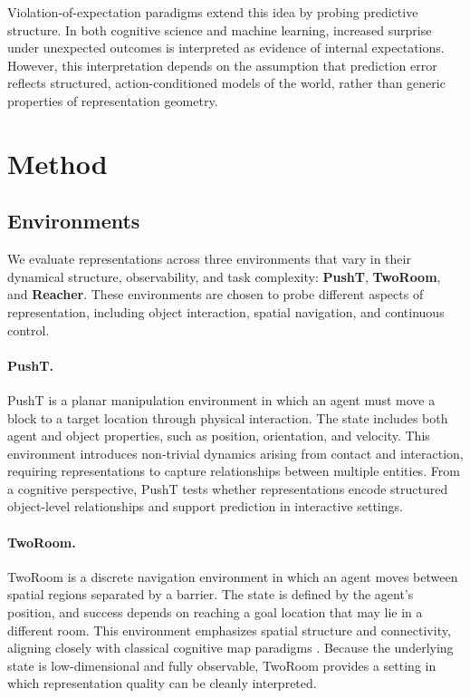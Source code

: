 \documentclass[10pt,twocolumn]{article}
\begin{document}
Violation-of-expectation paradigms extend this idea by probing predictive structure. In both cognitive science and machine learning, increased surprise under unexpected outcomes is interpreted as evidence of internal expectations. However, this interpretation depends on the assumption that prediction error reflects structured, action-conditioned models of the world, rather than generic properties of representation geometry.

\section{Method}

\subsection{Environments}

We evaluate representations across three environments that vary in their dynamical structure, observability, and task complexity: \textbf{PushT}, \textbf{TwoRoom}, and \textbf{Reacher}. These environments are chosen to probe different aspects of representation, including object interaction, spatial navigation, and continuous control.

\paragraph{PushT.}
PushT is a planar manipulation environment in which an agent must move a block to a target location through physical interaction. The state includes both agent and object properties, such as position, orientation, and velocity. This environment introduces non-trivial dynamics arising from contact and interaction, requiring representations to capture relationships between multiple entities. From a cognitive perspective, PushT tests whether representations encode structured object-level relationships and support prediction in interactive settings.

\paragraph{TwoRoom.}
TwoRoom is a discrete navigation environment in which an agent moves between spatial regions separated by a barrier. The state is defined by the agent's position, and success depends on reaching a goal location that may lie in a different room. This environment emphasizes spatial structure and connectivity, aligning closely with classical cognitive map paradigms \citep{tolman1948cognitive}. Because the underlying state is low-dimensional and fully observable, TwoRoom provides a setting in which representation quality can be cleanly interpreted.
\end{document}
